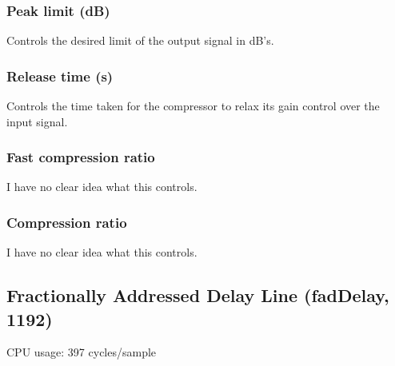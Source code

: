 \documentclass[11pt]{article}
\begin{document}
\subsubsection*{Peak limit (dB)}
Controls the desired limit of the output signal in dB's.\subsubsection*{Release time (s)}
Controls the time taken for the compressor to relax its gain control over the input signal.\subsubsection*{Fast compression ratio}
I have no clear idea what this controls.\subsubsection*{Compression ratio}
I have no clear idea what this controls.\subsection{Fractionally Addressed Delay Line (fadDelay, 1192)\label{fadDelay}\label{id1192}}
CPU usage: 397 cycles/sample
\end{document}
